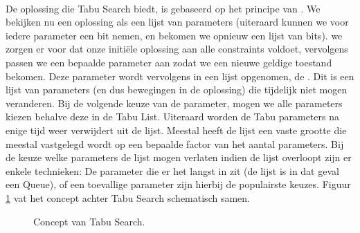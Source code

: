 \paragraph{}De oplossing die Tabu Search biedt, is gebaseerd op het principe van . We bekijken nu een oplossing als een lijst van parameters (uiteraard kunnen we voor iedere parameter een bit nemen, en bekomen we opnieuw een lijst van bits). we zorgen er voor dat onze initi\"ele oplossing aan alle constraints voldoet, vervolgens passen we een bepaalde parameter aan zodat we een nieuwe geldige toestand bekomen. Deze parameter wordt vervolgens in een lijst opgenomen, de . Dit is een lijst van parameters (en dus bewegingen in de oplossing) die tijdelijk niet mogen veranderen. Bij de volgende keuze van de parameter, mogen we alle parameters kiezen behalve deze in de Tabu List. Uiteraard worden de Tabu parameters na enige tijd weer verwijdert uit de lijst. Meestal heeft de lijst een vaste grootte die meestal vastgelegd wordt op een bepaalde factor van het aantal parameters. Bij de keuze welke parameters de lijst mogen verlaten indien de lijst overloopt zijn er enkele technieken: De parameter die er het langst in zit (de lijst is in dat geval een Queue), of een toevallige parameter zijn hierbij de populairste keuzes. Figuur \ref{fig:tabuSearchConcept} vat het concept achter Tabu Search schematisch samen.
\begin{figure}[htb]
\centering
{}
\caption{Concept van Tabu Search.}
\label{fig:tabuSearchConcept}
\end{figure}
